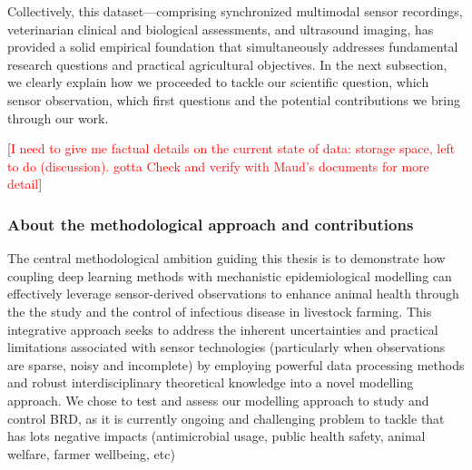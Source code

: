 Collectively, this dataset—comprising synchronized multimodal sensor recordings, veterinarian clinical and biological assessments, and ultrasound imaging, has provided a solid empirical foundation that simultaneously addresses fundamental research questions and practical agricultural objectives. In the next subsection, we clearly explain how we proceeded to tackle our scientific question, which sensor observation, which first questions and the potential contributions we bring through our work.

[\textcolor{red}{I need to give me factual details on the current state of data: storage space, left to do (discussion). gotta Check and verify with Maud's documents for more detail}]
 

\subsubsection{About the methodological approach and contributions}

The central methodological ambition guiding this thesis is to demonstrate how coupling deep learning methods with mechanistic epidemiological modelling can effectively leverage sensor-derived observations to enhance animal health through the the study and the control of infectious disease in livestock farming. This integrative approach seeks to address the inherent uncertainties and practical limitations associated with sensor technologies (particularly when observations are sparse, noisy and incomplete) by employing powerful data processing methods and robust interdisciplinary theoretical knowledge into a novel modelling approach. We chose to test and assess our modelling approach to study and control BRD, as it is currently ongoing and challenging problem to tackle that has lots negative impacts (antimicrobial usage, public health safety, animal welfare, farmer wellbeing, etc)

